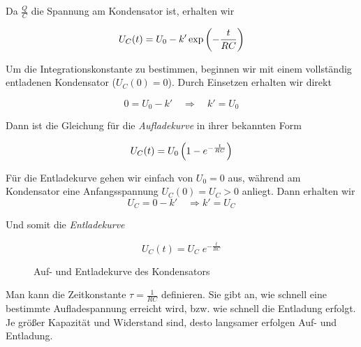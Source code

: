 \documentclass[a4paper,german,12pt,smallheadings]{scrartcl}
\begin{document}
Da $\frac{Q}{C}$ die Spannung am Kondensator ist, erhalten wir

\begin{equation}
  U_C(t) = U_0 - k' \exp \del{-\frac{t}{RC}}
\end{equation}

Um die Integrationskonstante zu bestimmen, beginnen wir mit einem vollständig
entladenen Kondensator ($U_C(0) = 0$). Durch Einsetzen erhalten wir direkt

\begin{equation}
  0 = U_0 - k' \quad \Rightarrow \quad k' = U_0
\end{equation}

Dann ist die Gleichung für die \textit{Aufladekurve} in ihrer bekannten Form

\begin{equation}
  U_C(t) = U_0 \del{1 - e^{-\frac{t}{RC}}}
\end{equation}

Für die Entladekurve gehen wir einfach von $U_0 = 0$ aus, während am
Kondensator eine Anfangsspannung $U_C(0) = U_C > 0$ anliegt. Dann erhalten wir
\begin{equation}
  U_C = 0 - k' \quad \Rightarrow k' = U_C
\end{equation}

Und somit die \textit{Entladekurve}

\begin{equation}
  U_C(t) = U_C \; e^{-\frac{t}{RC}}
\end{equation}

\begin{figure}[H]
  \begin{center}
    \caption{Auf- und Entladekurve des Kondensators}
  \end{center}
\end{figure}

Man kann die Zeitkonstante $\tau = \frac{1}{RC}$ definieren. Sie gibt an, wie
schnell eine bestimmte Aufladespannung erreicht wird, bzw. wie schnell die
Entladung erfolgt. Je größer Kapazität und Widerstand sind, desto langsamer
erfolgen Auf- und Entladung.
\end{document}
